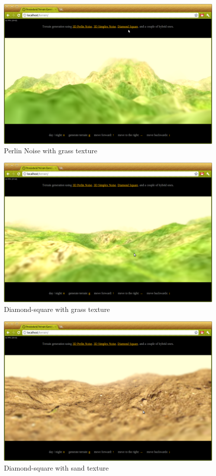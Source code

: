 \begin{figure}
	\center
	\includegraphics[scale=0.4]{images/demo_0_1.png}
	\caption{Perlin Noise with grass texture}
	\label{fig:demo_0_1}
\end{figure}
\begin{figure}
	\center
	\includegraphics[scale=0.4]{images/demo_1_1.png}
	\caption{Diamond-square with grass texture}
	\label{fig:demo_1_1}
\end{figure}
\begin{figure}
	\center
	\includegraphics[scale=0.4]{images/demo_1_2.png}
	\caption{Diamond-square with sand texture}
	\label{fig:demo_1_2}
\end{figure}
